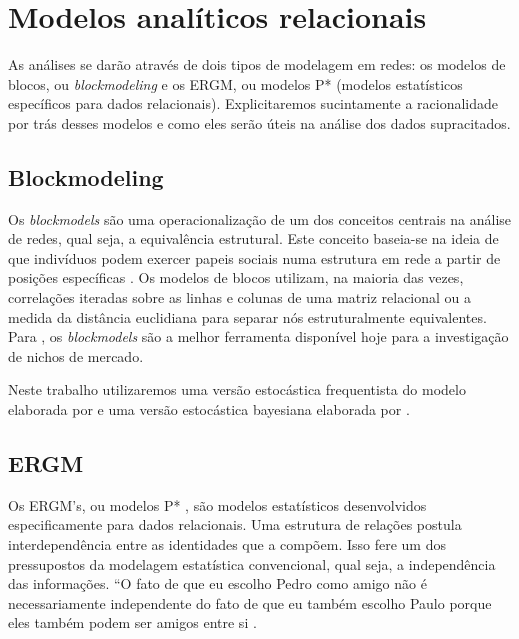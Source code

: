 \documentclass[a4paper, 12pt, openright, oneside, german, french, english, brazil]{abntex2}
\begin{document}
	\section{Modelos analíticos relacionais}



	As análises se darão através de dois tipos de modelagem em redes: os modelos de blocos, ou \textit{blockmodeling} e os ERGM, ou modelos P* (modelos estatísticos específicos para dados relacionais). Explicitaremos sucintamente a racionalidade por trás desses modelos e como eles serão úteis na análise dos dados supracitados.



	\subsection{Blockmodeling}



	Os \textit{blockmodels} são uma operacionalização de um dos conceitos centrais na análise de redes, qual seja, a equivalência estrutural. Este conceito baseia-se na ideia de que indivíduos podem exercer papeis sociais numa estrutura em rede a partir de posições específicas \cite{lazega2014redes}. Os modelos de blocos utilizam, na maioria das vezes, correlações iteradas sobre as linhas e colunas de uma matriz relacional ou a medida da distância euclidiana para separar nós estruturalmente equivalentes. Para , os \textit{blockmodels} são a melhor ferramenta disponível hoje para a investigação de nichos de mercado.



	Neste trabalho utilizaremos uma versão estocástica frequentista do modelo elaborada por  e uma versão estocástica bayesiana elaborada por .



	\subsection{ERGM}



	Os ERGM's, ou modelos P* \cite{robins2007introduction,lusher2013exponential,lazega2014redes,brailly2017explorer}, são modelos estatísticos desenvolvidos especificamente para dados relacionais. Uma estrutura de relações postula interdependência entre as identidades que a compõem. Isso fere um dos pressupostos da modelagem estatística convencional, qual seja, a independência das informações. ``O fato de que eu escolho Pedro como amigo não é necessariamente independente do fato de que eu também escolho Paulo porque eles também podem ser amigos entre si \cite[p. 76]{lazega2014redes}.
\end{document}
